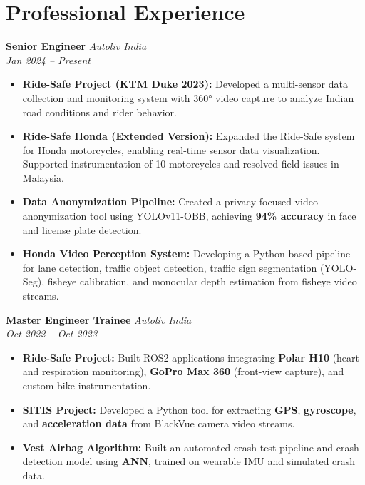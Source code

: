 \documentclass[a4paper,10pt]{article}
\begin{document}
\vspace{0.3cm}

\section*{Professional Experience}

\textbf{Senior Engineer} \hfill \textit{Autoliv India} \\
\textit{Jan 2024 – Present}
\begin{itemize}[leftmargin=1.5em]
    \item \textbf{Ride-Safe Project (KTM Duke 2023):} Developed a multi-sensor data collection and monitoring system with 360° video capture to analyze Indian road conditions and rider behavior.
    \item \textbf{Ride-Safe Honda (Extended Version):} Expanded the Ride-Safe system for Honda motorcycles, enabling real-time sensor data visualization. Supported instrumentation of 10 motorcycles and resolved field issues in Malaysia.
    \item \textbf{Data Anonymization Pipeline:} Created a privacy-focused video anonymization tool using YOLOv11-OBB, achieving \textbf{94\% accuracy} in face and license plate detection.
    \item \textbf{Honda Video Perception System:} Developing a Python-based pipeline for lane detection, traffic object detection, traffic sign segmentation (YOLO-Seg), fisheye calibration, and monocular depth estimation from fisheye video streams.
\end{itemize}

\vspace{0.2cm}

\textbf{Master Engineer Trainee} \hfill \textit{Autoliv India} \\
\textit{Oct 2022 – Oct 2023}
\begin{itemize}[leftmargin=1.5em]
    \item \textbf{Ride-Safe Project:} Built ROS2 applications integrating \textbf{Polar H10} (heart and respiration monitoring), \textbf{GoPro Max 360} (front-view capture), and custom bike instrumentation.
    \item \textbf{SITIS Project:} Developed a Python tool for extracting \textbf{GPS}, \textbf{gyroscope}, and \textbf{acceleration data} from BlackVue camera video streams.
    \item \textbf{Vest Airbag Algorithm:} Built an automated crash test pipeline and crash detection model using \textbf{ANN}, trained on wearable IMU and simulated crash data.
\end{itemize}
\end{document}
